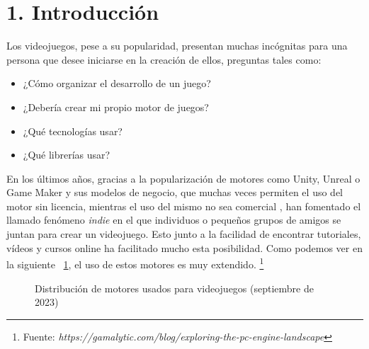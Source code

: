 \chapter*{1. Introducción}\label{cap:intro}

Los videojuegos, pese a su popularidad, presentan muchas incógnitas para una persona que desee iniciarse en la creación
de ellos, preguntas tales como:
\begin{itemize}
    \item ¿Cómo organizar el desarrollo de un juego?
    \item ¿Debería crear mi propio motor de juegos?
    \item ¿Qué tecnologías usar?
    \item ¿Qué librerías usar?
\end{itemize}

En los últimos años, gracias a la popularización de motores como Unity\cite{Unity}, Unreal\cite{Unreal} o
Game Maker\cite{gamemaker} y sus modelos de negocio, que muchas veces permiten el uso del motor sin licencia, mientras el uso
del mismo no sea comercial\cite{unity-pricing} \cite{unreal-pricing} \cite{gamemaker-pricing}, han fomentado el llamado fenómeno \textit{indie} en el que individuos o pequeños grupos de
amigos se juntan para crear un videojuego. Esto junto a la facilidad de encontrar tutoriales, vídeos y cursos online
ha facilitado mucho esta posibilidad. Como podemos ver en la siguiente \figurename~\ref{engine_distribution}, el uso de estos motores es muy extendido. \footnote{Fuente: \textit{https://gamalytic.com/blog/exploring-the-pc-engine-landscape}}

\begin{figure}[h!]
    \centering
    
    
    \caption{Distribución de motores usados para videojuegos (septiembre de 2023)}
    \label{engine_distribution}
\end{figure}

